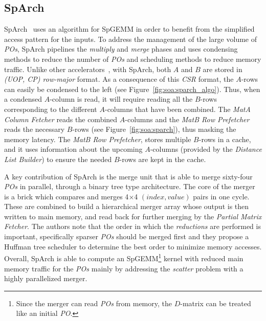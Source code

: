 
\subsection{SpArch}
\label{sec:soa:sparch}

SpArch~\cite{Zhekai2020_SpArch} uses an  algorithm for SpGEMM in order to benefit from the simplified access pattern for the inputs. To address the management of the large volume of \emph{POs}, SpArch  pipelines the \emph{multiply} and \emph{merge} phases and uses condensing methods to reduce the number of \emph{POs} and scheduling methods to reduce memory traffic.
Unlike other  accelerators~\cite{Pal2018_OuterSPACE}, with SpArch, both $A$ and $B$ are stored in \emph{(UOP, CP) row-major} format. As a consequence of this \emph{CSR} format, the $A$-rows can easily be condensed to the left (see Figure~\ref{fig:soa:sparch_algo}). Thus, when a condensed $A$-column is read, it will require reading all the $B$-rows corresponding to the different $A$-columns that have been combined. The \emph{MatA Column Fetcher} reads the combined $A$-columns and the \emph{MatB Row Prefetcher} reads the necessary $B$-rows (see Figure~\ref{fig:soa:sparch}), thus masking the memory latency. The \emph{MatB Row Prefetcher}, stores multiple $B$-rows in a cache, and it uses information about the upcoming $A$-columns  (provided by the \emph{Distance List Builder}) to ensure the needed $B$-rows are kept in the cache.

A key contribution of SpArch is the merge unit that is able to merge sixty-four \emph{POs} in parallel, through a binary tree type architecture. The core of the merger is a brick which compares and merges 4$\times$4 $(index, value)$ pairs in one cycle. These are combined to build a hierarchical merger array whose output is then written to main memory, and read back for further merging by the \emph{Partial Matrix Fetcher}. The authors note that the order in which the \emph{reductions} are performed is important, specifically sparser \emph{POs} should be merged first and they propose a Huffman tree scheduler to determine the best order to minimize memory accesses.
Overall, SpArch is able to compute an  SpGEMM\footnote{Since the merger can read \emph{POs} from memory, the $D$-matrix can be treated like an initial \emph{PO}.} kernel with reduced main memory traffic for the \emph{POs} mainly by addressing the \emph{scatter} problem with a highly parallelized merger.

